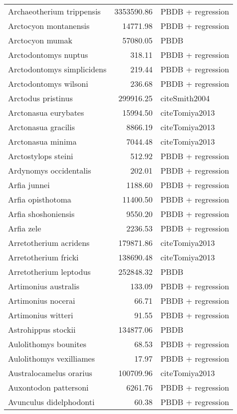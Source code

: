 \begin{table}[ht]
\begin{tabular}{lrl}
  Archaeotherium trippensis & 3353590.86 & PBDB + regression \\ 
  Arctocyon montanensis & 14771.98 & PBDB + regression \\ 
  Arctocyon mumak & 57080.05 & PBDB \\ 
  Arctodontomys nuptus & 318.11 & PBDB + regression \\ 
  Arctodontomys simplicidens & 219.44 & PBDB + regression \\ 
  Arctodontomys wilsoni & 236.68 & PBDB + regression \\ 
  Arctodus pristinus & 299916.25 & cite{Smith2004} \\ 
  Arctonasua eurybates & 15994.50 & cite{Tomiya2013} \\ 
  Arctonasua gracilis & 8866.19 & cite{Tomiya2013} \\ 
  Arctonasua minima & 7044.48 & cite{Tomiya2013} \\ 
  Arctostylops steini & 512.92 & PBDB + regression \\ 
  Ardynomys occidentalis & 202.01 & PBDB + regression \\ 
  Arfia junnei & 1188.60 & PBDB + regression \\ 
  Arfia opisthotoma & 11400.50 & PBDB + regression \\ 
  Arfia shoshoniensis & 9550.20 & PBDB + regression \\ 
  Arfia zele & 2236.53 & PBDB + regression \\ 
  Arretotherium acridens & 179871.86 & cite{Tomiya2013} \\ 
  Arretotherium fricki & 138690.48 & cite{Tomiya2013} \\ 
  Arretotherium leptodus & 252848.32 & PBDB \\ 
  Artimonius australis & 133.09 & PBDB + regression \\ 
  Artimonius nocerai & 66.71 & PBDB + regression \\ 
  Artimonius witteri & 91.55 & PBDB + regression \\ 
  Astrohippus stockii & 134877.06 & PBDB \\ 
  Aulolithomys bounites & 68.53 & PBDB + regression \\ 
  Aulolithomys vexilliames & 17.97 & PBDB + regression \\ 
  Australocamelus orarius & 100709.96 & cite{Tomiya2013} \\ 
  Auxontodon pattersoni & 6261.76 & PBDB + regression \\ 
  Avunculus didelphodonti & 60.38 & PBDB + regression \\ 

\end{tabular}
\end{table}
